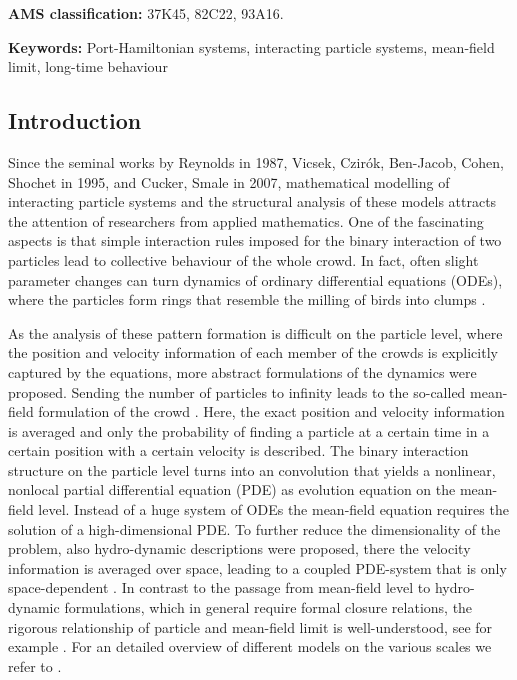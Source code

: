 \documentclass[11pt]{article}
\begin{document}
\begin{minipage}{0.9\linewidth}
 \footnotesize
\textbf{AMS classification:} 37K45, 82C22, 93A16.
\medskip

\noindent
\textbf{Keywords:} Port-Hamiltonian systems, interacting particle systems, mean-field limit, long-time behaviour
\end{minipage}
    \begin{bibunit}[abbrv]
    \section{Introduction}
Since the seminal works by Reynolds \cite{reynolds1987flocks} in 1987, Vicsek, Czirók, Ben-Jacob, Cohen,  Shochet \cite{vicsek1995novel} in 1995, and Cucker, Smale  \cite{CuckerSmale} in 2007, mathematical modelling of interacting particle systems and the structural analysis of these models attracts the attention of researchers from applied mathematics. One of the fascinating aspects is that simple interaction rules imposed for the binary interaction of two particles lead to collective behaviour of the whole crowd. In fact, often slight parameter changes can turn dynamics of ordinary differential equations (ODEs), where the particles form rings that resemble the milling of birds into clumps \cite{Dorsogna2006self}. 

As the analysis of these pattern formation is difficult on the particle level, where the position and velocity information of each member of the crowds is explicitly captured by the equations, more abstract formulations of the dynamics were proposed. Sending the number of particles to infinity leads to the so-called mean-field formulation of the crowd \cite{golse2016dynamics}. Here, the exact position and velocity information is averaged and only the probability of finding a particle at a certain time in a certain position with a certain velocity is described. The binary interaction structure on the particle level turns into an convolution that yields a nonlinear, nonlocal partial differential equation (PDE) as evolution equation on the mean-field level. Instead of a huge system of ODEs the mean-field equation requires the solution of a high-dimensional PDE. To further reduce the dimensionality of the problem, also hydro-dynamic descriptions were proposed, there the velocity information is averaged over space, leading to a coupled PDE-system that is only space-dependent \cite{hydro}. In contrast to the passage from mean-field level to hydro-dynamic formulations, which in general require formal closure relations, the rigorous relationship of particle and mean-field limit is well-understood, see for example \cite{golse2016dynamics}. For an detailed overview of different models on the various scales we refer to \cite{Shvydkoy}.


\end{bibunit}
\end{document}
